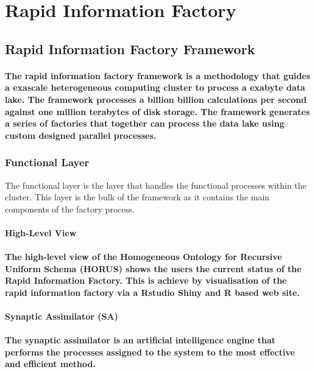 \documentclass{acm_proc_article-sp}
\begin{document}
\section{Rapid Information Factory}
\subsection{Rapid Information Factory Framework}
\paragraph{The rapid information factory framework is a methodology that guides a exascale \cite{bergman2008exascale} heterogeneous computing cluster to process a exabyte data lake. The framework processes a billion billion calculations per second against one million terabytes of disk storage. The framework generates a series of factories that together can process the data lake using custom designed parallel processes.}
\subsubsection{Functional Layer}
The functional layer is the layer that handles the functional processes within the cluster.
This layer is the bulk of the framework as it contains the main components of the factory process.
\paragraph{\textbf{High-Level View}}
\paragraph{The high-level view of the Homogeneous Ontology for Recursive Uniform Schema (HORUS) shows the users the current status of the Rapid Information Factory. This is achieve by visualisation of the rapid information factory via a Rstudio Shiny \cite{ortega2013combining} and R \cite{team2000r} based web site.}
\paragraph{\textbf{Synaptic Assimilator (SA)}}
\paragraph{The synaptic assimilator is an artificial intelligence \cite{o2013artificial} engine that performs the processes assigned to the system to the most effective and efficient method.}
\end{document}
